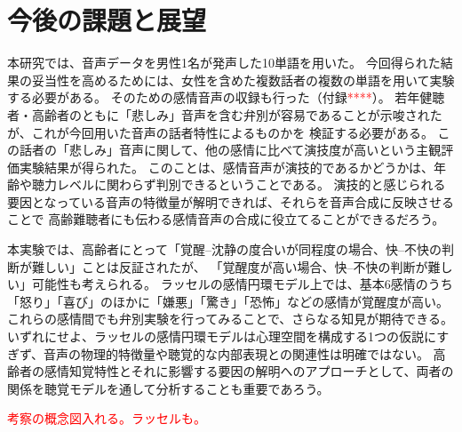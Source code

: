 

%




\section{今後の課題と展望}
\label{sec:Challenges}
本研究では、音声データを男性1名が発声した10単語を用いた。
今回得られた結果の妥当性を高めるためには、女性を含めた複数話者の複数の単語を用いて実験する必要がある。
そのための感情音声の収録も行った（付録\textcolor{red}{****}）。
若年健聴者・高齢者のともに「悲しみ」音声を含む弁別が容易であることが示唆されたが、これが今回用いた音声の話者特性によるものかを
検証する必要がある。
この話者の「悲しみ」音声に関して、他の感情に比べて演技度が高いという主観評価実験結果が得られた。
このことは、感情音声が演技的であるかどうかは、年齢や聴力レベルに関わらず判別できるということである。
演技的と感じられる要因となっている音声の特徴量が解明できれば、それらを音声合成に反映させることで
高齢難聴者にも伝わる感情音声の合成に役立てることができるだろう。

本実験では、高齢者にとって「覚醒–沈静の度合いが同程度の場合、快–不快の判断が難しい」ことは反証されたが、
「覚醒度が高い場合、快–不快の判断が難しい」可能性も考えられる。
ラッセルの感情円環モデル上では、基本6感情のうち「怒り」「喜び」のほかに「嫌悪」「驚き」「恐怖」などの感情が覚醒度が高い。
これらの感情間でも弁別実験を行ってみることで、さらなる知見が期待できる。
いずれにせよ、ラッセルの感情円環モデルは心理空間を構成する1つの仮説にすぎず、音声の物理的特徴量や聴覚的な内部表現との関連性は明確ではない。
高齢者の感情知覚特性とそれに影響する要因の解明へのアプローチとして、両者の関係を聴覚モデルを通して分析することも重要であろう。



\textcolor{red}{考察の概念図入れる。ラッセルも。}

